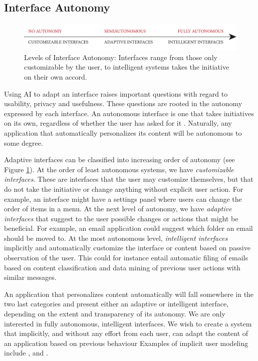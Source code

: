 \subsection{Interface Autonomy}

\begin{figure}[t]
  \includegraphics[width=\textwidth]{../graphics/autonomy.pdf}
  \caption[Levels of Interface Autonomy]{
    Levels of Interface Autonomy:
    Interfaces range from those only customizable by the user, 
    to intelligent systems takes the initiative on their own accord.
  }
  \label{fig:autonomy}
\end{figure}

Using AI to adapt an interface raises important questions with regard to usability, privacy and usefulness.
These questions are rooted in the autonomy expressed by each interface.
An autonomous interface is one that takes initiatives on its own, regardless of whether the user has asked for it \cite[p2]{Lieberman}. 
Naturally, any application that automatically personalizes its content will be autonomous to some degree.

Adaptive interfaces can be classified into increasing order of autonomy (see Figure \ref{fig:autonomy}). 
At the order of least autonomous systems, we have \emph{customizable interfaces}. 
These are interfaces that the user may customize themselves, but that do not take the initiative or change anything without explicit user action. 
For example, an interface might have a settings panel where users can change the order of items in a menu.
At the next level of autonomy, we have \emph{adaptive interfaces} that suggest to the user possible changes or actions that might be beneficial. For example, an email application could suggest which folder an email should be moved to.
At the most autonomous level, \emph{intelligent interfaces} implicitly and automatically customize the interface or content based on passive observation of the user. 
This could for instance entail automatic filing of emails based on content classification and data mining of previous user actions with similar messages.

An application that personalizes content automatically will fall somewhere in the two last categories and present either an adaptive or intelligent interface, 
depending on the extent and transparency of its autonomy.
We are only interested in fully autonomous, intelligent interfaces.
We wish to create a system that implicitly, and without any effort from each user,
can adapt the content of an application based on previous behaviour
Examples of implicit user modeling include \cite{Qiu2006}, \cite{Shen2005} and \cite{Carmel2009}.


